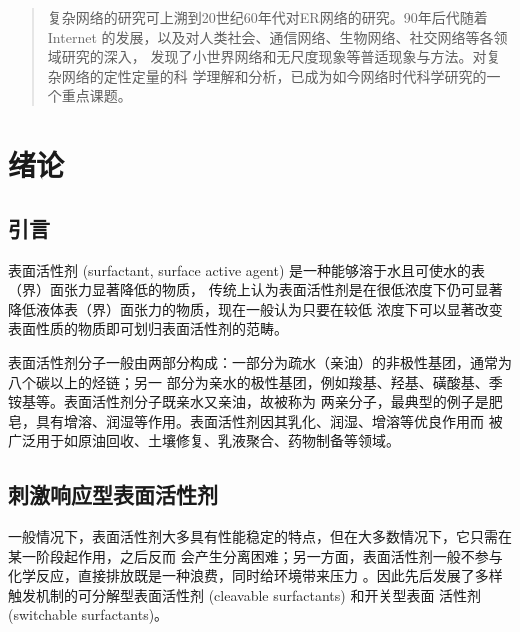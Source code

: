 \documentclass[bachelor,fandolfonts,replaceperiod]{jnuthesis}
\author{陈育明}
\institute{江南大学}
\begin{document}
    \maketitle
    \frontmatter
    \begin{abstract}
        复杂网络的研究可上溯到20世纪60年代对ER网络的研究。90年后代随着Internet
        的发展，以及对人类社会、通信网络、生物网络、社交网络等各领域研究的深入，
        发现了小世界网络和无尺度现象等普适现象与方法。对复杂网络的定性定量的科
        学理解和分析，已成为如今网络时代科学研究的一个重点课题。
    \end{abstract}
    
    \begin{englishabstract}
        \lipsum[1]
    \end{englishabstract}
    
    \tableofcontents
    
    \mainmatter
    
    \chapter{绪论}\label{chapter:introduction}
    \section{引言}
    表面活性剂 (surfactant, surface active agent) 是一种能够溶于水且可使水的表（界）面张力显著降低的物质，
    传统上认为表面活性剂是在很低浓度下仍可显著降低液体表（界）面张力的物质，现在一般认为只要在较低
    浓度下可以显著改变表面性质的物质即可划归表面活性剂的范畴。
    
    表面活性剂分子一般由两部分构成：一部分为疏水（亲油）的非极性基团，通常为八个碳以上的烃链；另一
    部分为亲水的极性基团，例如羧基、羟基、磺酸基、季铵基等。表面活性剂分子既亲水又亲油，故被称为
    两亲分子，最典型的例子是肥皂，具有增溶、润湿等作用。表面活性剂因其乳化、润湿、增溶等优良作用而
    被广泛用于如原油回收、土壤修复、乳液聚合、药物制备等领域\cite{秦勇2009}。
    
    \section{刺激响应型表面活性剂}
    一般情况下，表面活性剂大多具有性能稳定的特点，但在大多数情况下，它只需在某一阶段起作用，之后反而
    会产生分离困难；另一方面，表面活性剂一般不参与化学反应，直接排放既是一种浪费，同时给环境带来压力
    \cite{秦勇2009}。因此先后发展了多样触发机制的可分解型表面活性剂 (cleavable surfactants) 和开关型表面
    活性剂 (switchable surfactants)。
    
\end{document}
